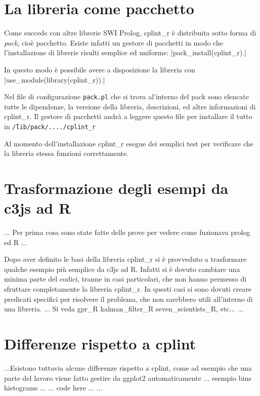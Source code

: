 \documentclass[10pt,titlepage,twoside,a4paper]{report}
\begin{document}

\section{La libreria come pacchetto}
Come succede con altre librerie SWI Prolog, cplint\_r è distribuita sotto 
forma di \emph{pack}, cioè pacchetto. Esiste infatti un gestore di pacchetti 
in modo che l'installazione di librerie risulti semplice ed uniforme: 
|pack_install(cplint_r).|

In questo modo è possibile avere a disposizione la libreria con 
|use_module(library(cplint_r)).|

Nel file di configurazione \texttt{pack.pl} che si trova al'interno del pack 
sono elencate tutte le dipendenze, la versione della libreria, descrizioni, 
ed altre informazioni di cplint\_r. Il gestore di pacchetti andrà a leggere 
questo file per installare il tutto in \texttt{\~/lib/pack/..../cplint\_r}

Al momento dell'installazione cplint\_r esegue dei semplici 
test per verificare che la libreria stessa funzioni correttamente.


\section{Trasformazione degli esempi da c3js ad R} \label{sec:trasformazione-
degli-esempi-da-c3js-ad-r}
... Per prima cosa sono state fatte delle prove per vedere come fuzionava 
prolog ed R ...

Dopo aver definito le basi della libreria cplint\_r si è provveduto a 
trasformare qualche esempio più semplice da c3js ad R. Infatti si è 
dovuto cambiare una minima parte del codici, tranne in casi particolari, che 
non hanno permesso di sfruttare completamente la 
libreria cplint\_r. In questi casi si sono dovuti creare predicati specifici 
per risolvere il problema, che non sarebbero utili all'interno di una 
libreria. ... Si veda gpr\_R kalman\_filter\_R seven\_scientists\_R, etc... 
...

\section{Differenze rispetto a cplint}
...Esistono tuttavia alcune differenze rispetto a cplint, come ad esempio che 
una parte del lavoro viene fatto gestire da ggplot2 automaticamente ... esempio 
bins histograms ... ... code here ...
...
\end{document}
